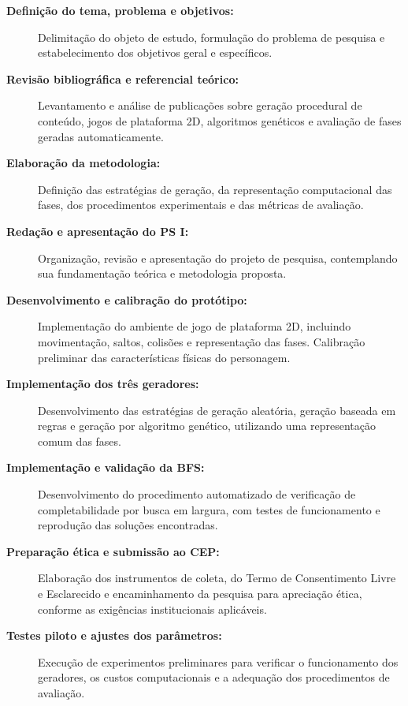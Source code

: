 \begin{description}

  \item[\textbf{Definição do tema, problema e objetivos:}]
  Delimitação do objeto de estudo, formulação do problema de pesquisa e 
  estabelecimento dos objetivos geral e específicos.

  \item[\textbf{Revisão bibliográfica e referencial teórico:}]
  Levantamento e análise de publicações sobre geração procedural de conteúdo, 
  jogos de plataforma 2D, algoritmos genéticos e avaliação de fases geradas 
  automaticamente.

  \item[\textbf{Elaboração da metodologia:}]
  Definição das estratégias de geração, da representação computacional das 
  fases, dos procedimentos experimentais e das métricas de avaliação.

  \item[\textbf{Redação e apresentação do PS I:}]
  Organização, revisão e apresentação do projeto de pesquisa, contemplando sua
  fundamentação teórica e metodologia proposta.

  \item[\textbf{Desenvolvimento e calibração do protótipo:}]
  Implementação do ambiente de jogo de plataforma 2D, incluindo movimentação,
  saltos, colisões e representação das fases. Calibração preliminar das 
  características físicas do personagem.

  \item[\textbf{Implementação dos três geradores:}]
  Desenvolvimento das estratégias de geração aleatória, geração baseada em 
  regras e geração por algoritmo genético, utilizando uma representação comum 
  das fases.

  \item[\textbf{Implementação e validação da BFS:}]
  Desenvolvimento do procedimento automatizado de verificação de 
  completabilidade por busca em largura, com testes de funcionamento e 
  reprodução das soluções encontradas.

  \item[\textbf{Preparação ética e submissão ao CEP:}]
  Elaboração dos instrumentos de coleta, do Termo de Consentimento Livre e
  Esclarecido e encaminhamento da pesquisa para apreciação ética, conforme as
  exigências institucionais aplicáveis.

  \item[\textbf{Testes piloto e ajustes dos parâmetros:}]
  Execução de experimentos preliminares para verificar o funcionamento dos 
  geradores, os custos computacionais e a adequação dos procedimentos de 
  avaliação.


\end{description}
